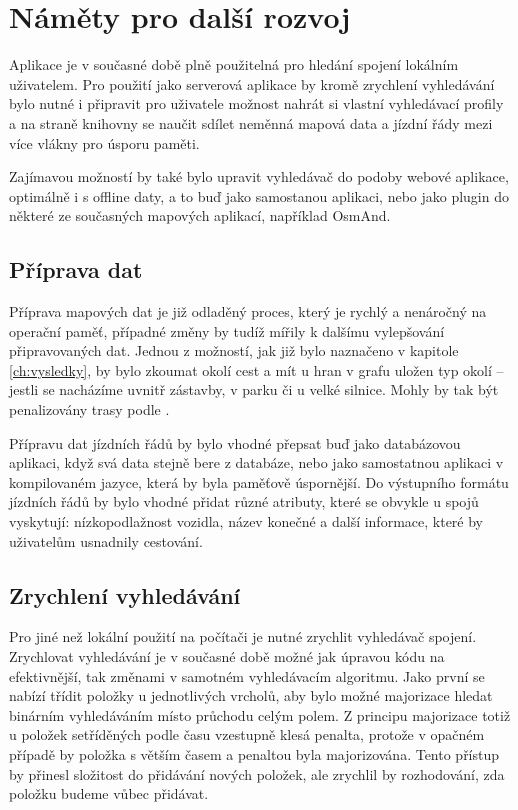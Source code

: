 \section{Náměty pro další rozvoj}
Aplikace je v současné době plně použitelná pro hledání spojení lokálním
uživatelem. Pro použití jako serverová aplikace by kromě zrychlení vyhledávání
bylo nutné i připravit pro uživatele možnost nahrát si vlastní vyhledávací
profily a na straně knihovny se naučit sdílet neměnná mapová data a jízdní řády
mezi více vlákny pro úsporu paměti. 

Zajímavou možností by také bylo upravit vyhledávač do podoby webové aplikace,
optimálně i s offline daty, a to buď jako samostanou aplikaci, nebo jako plugin
do některé ze současných mapových aplikací, například OsmAnd.

\subsection{Příprava dat}
Příprava mapových dat je již odladěný proces, který je rychlý a nenáročný na
operační paměť, případné změny by tudíž mířily k dalšímu vylepšování
připravovaných dat. Jednou z možností, jak již bylo naznačeno v kapitole
\ref{ch:vysledky}, by bylo zkoumat okolí cest a mít u hran v grafu uložen typ
okolí -- jestli se nacházíme uvnitř zástavby, v parku či u velké silnice. Mohly
by tak být penalizovány trasy podle .

Přípravu dat jízdních řádů by bylo vhodné přepsat buď jako databázovou aplikaci,
když svá data stejně bere z databáze, nebo jako samostatnou aplikaci v
kompilovaném jazyce, která by byla paměťově úspornější. Do výstupního formátu
jízdních řádů by bylo vhodné přidat různé atributy, které se obvykle u spojů
vyskytují: nízkopodlažnost vozidla, název konečné a další informace, které by
uživatelům usnadnily cestování.

\subsection{Zrychlení vyhledávání}
Pro jiné než lokální použití na počítači je nutné zrychlit vyhledávač spojení.
Zrychlovat vyhledávání je v současné době možné jak úpravou kódu na
efektivnější, tak změnami v samotném vyhledávacím algoritmu. Jako první se
nabízí třídit položky u jednotlivých vrcholů, aby bylo možné majorizace hledat
binárním vyhledáváním místo průchodu celým polem. Z principu majorizace totiž u
položek setříděných podle času vzestupně klesá penalta, protože v opačném
případě by položka s větším časem a penaltou byla majorizována. Tento přístup by
přinesl složitost do přidávání nových položek, ale zrychlil by rozhodování, zda
položku budeme vůbec přidávat. 

